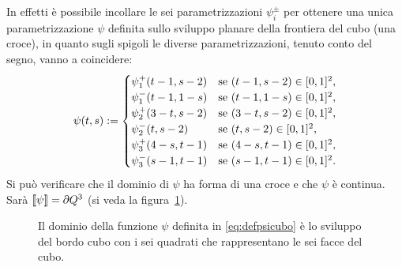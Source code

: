 In effetti è possibile incollare le sei parametrizzazioni $\psi_i^\pm$ 
per ottenere una unica parametrizzazione $\psi$ definita sullo sviluppo 
planare della frontiera del cubo (una croce), 
in quanto sugli spigoli le diverse parametrizzazioni,
tenuto conto del segno, vanno a coincidere:
\begin{equation}\label{eq:defpsicubo}
\psi(t,s) := \begin{cases}
  \psi_1^+(t-1,s-2) & \text{se } (t-1,s-2)\in[0,1]^2,\\
  \psi_1^-(t-1,1-s)   & \text{se } (t-1,1-s)\in[0,1]^2,\\
  \psi_2^+(3-t,s-2) & \text{se } (3-t,s-2)\in[0,1]^2,\\
  \psi_2^-(t,s-2)   & \text{se } (t,s-2)\in[0,1]^2,\\
  \psi_3^+(4-s,t-1) & \text{se } (4-s,t-1)\in[0,1]^2,\\
  \psi_3^-(s-1,t-1) & \text{se } (s-1,t-1)\in[0,1]^2.
\end{cases}
\end{equation}
Si può verificare che il dominio di $\psi$ ha forma di una croce e che $\psi$ 
è continua. Sarà ${\left\llbracket \psi \right\rrbracket} = \partial Q^3$ (si veda la figura~\ref{fig:sviluppocubo}).
\begin{figure}
\begin{center}
\end{center}
\caption{
  Il dominio della funzione $\psi$ definita in \eqref{eq:defpsicubo}
  è lo sviluppo del bordo cubo con i sei quadrati che rappresentano le sei facce del cubo.
  }
\label{fig:sviluppocubo}
\end{figure}

